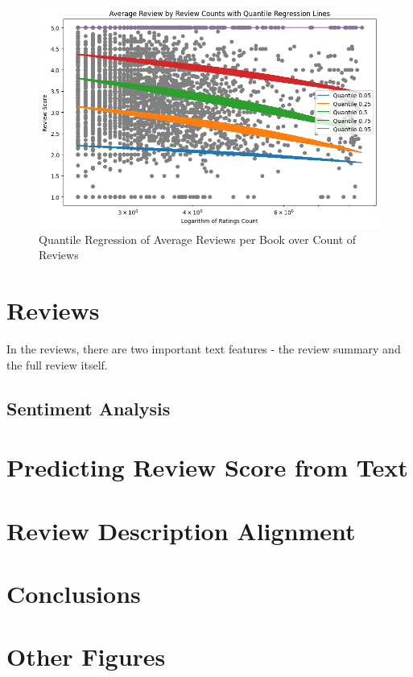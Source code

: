 \documentclass[12pt]{article}
\numberwithin{equation}{section}
\begin{document}
\begin{figure}
    \centering
    \includegraphics[scale=0.58]{quantreg_reviewscore.png}
\caption{Quantile Regression of Average Reviews per Book over Count of Reviews} 
\end{figure}



\section{Reviews}
In the reviews, there are two important text features - the review summary and the full review itself.


\subsection{Sentiment Analysis}


\section{Predicting Review Score from Text}

\section{Review Description Alignment}

\section{Conclusions}

\section{Other Figures}
\end{document}
